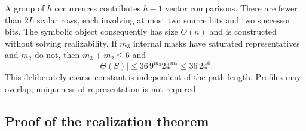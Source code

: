 A group of $h$ occurrences contributes $h-1$ vector comparisons. There are fewer
than $2L$ scalar rows, each involving at most two source bits and two successor bits.
The symbolic object consequently has size $O(n)$ and is constructed without solving
realizability. If $m_3$ internal masks have saturated representatives and $m_2$ do
not, then $m_3+m_2\le6$ and
\begin{equation}\label{eq:profile-bound}
 |\Theta(S)|\le36\,9^{m_3}24^{m_2}\le36\,24^6.
\end{equation}
This deliberately coarse constant is independent of the path length. Profiles may
overlap; uniqueness of representation is not required.

\subsection{Proof of the realization theorem}

